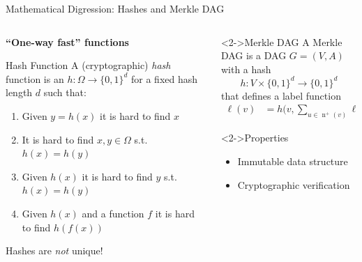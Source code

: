 \documentclass[xetex]{beamer}
\begin{document}
\begin{frame}{Mathematical Digression: Hashes and Merkle DAG}
  \begin{columns}
    \begin{column}{.5\linewidth}
      \textbf{``One-way fast'' functions}
      \begin{block}{Hash Function}
        A (cryptographic) \emph{hash} function is an $h : \Omega \to \{0,1\}^d$
        for a fixed hash length $d$ such that:
        \begin{enumerate}
          \item Given $y = h(x)$ it is hard to find $x$
          \item It is hard to find $x,y \in \Omega$ s.t. $h(x) = h(y)$
          \item Given $h(x)$ it is hard to find $y$ s.t. $h(x) = h(y)$
          \item Given $h(x)$ and a function $f$ it is hard to find $h(f(x))$
        \end{enumerate}
      \end{block}
      Hashes are \emph{not} unique!
    \end{column}
    \begin{column}{.5\linewidth}
      \begin{block}<2->{Merkle DAG}
        A Merkle DAG is a DAG $G = (V,A)$ with a hash
        \[
          h : V \times \{0,1\}^d \to \{0,1\}^d
        \]
        that defines a label function
        \begin{align*}
          \ell(v) &= h\biggl(v,
            \sum_{u \in \operatorname{n}^+(v)} \ell(u) \biggr)
        \end{align*}
      \end{block}
      \begin{alertblock}<2->{Properties}
        \begin{itemize}
          \item Immutable data structure
          \item Cryptographic verification
        \end{itemize}
      \end{alertblock}
    \end{column}
  \end{columns}
\end{frame}
\end{document}
